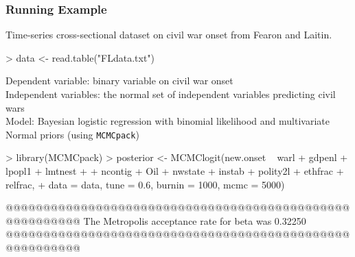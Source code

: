 \documentclass[handout]{beamer}
\begin{document}
\begin{frame}[fragile]
\frametitle{Running Example}
\pause
Time-series cross-sectional dataset on civil war onset from Fearon and Laitin.
\pause
\tiny
\medskip
\begin{Schunk}
\begin{Sinput}
> data <- read.table("FLdata.txt")
\end{Sinput}
\end{Schunk}
\normalsize
\pause
\bigskip
Dependent variable: binary variable on civil war onset\\
\pause
\bigskip
Independent variables: the normal set of independent variables
predicting civil wars \\
\pause
\bigskip
Model: Bayesian logistic regression with binomial likelihood and
multivariate Normal priors (using {\tt MCMCpack})
\pause
\tiny
\medskip
\begin{Schunk}
\begin{Sinput}
> library(MCMCpack)
> posterior <- MCMClogit(new.onset ~ warl + gdpenl + lpopl1 + lmtnest + 
+     ncontig + Oil + nwstate + instab + polity2l + ethfrac + relfrac, 
+     data = data, tune = 0.6, burnin = 1000, mcmc = 5000)
\end{Sinput}
\begin{Soutput}
@@@@@@@@@@@@@@@@@@@@@@@@@@@@@@@@@@@@@@@@@@@@@@@@@@@@@@@@
The Metropolis acceptance rate for beta was 0.32250
@@@@@@@@@@@@@@@@@@@@@@@@@@@@@@@@@@@@@@@@@@@@@@@@@@@@@@@@
\end{Soutput}
\end{Schunk}
\normalsize
\end{frame}
\end{document}
